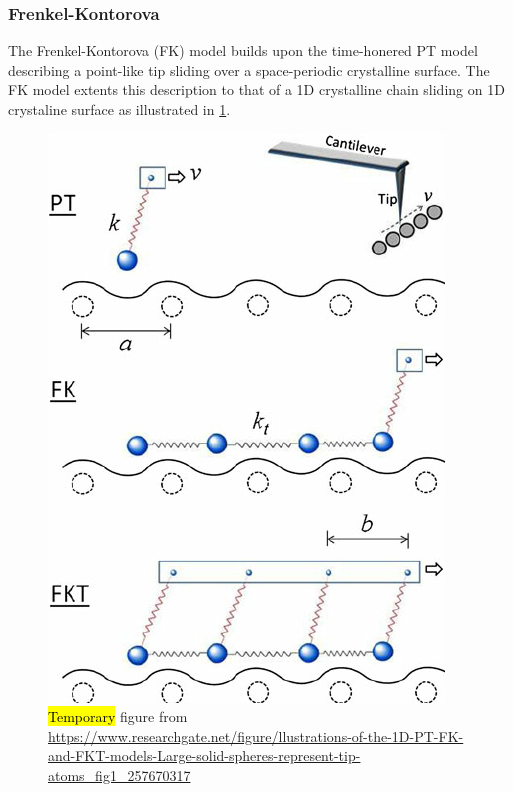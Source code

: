 



\subsubsection{Frenkel-Kontorova}


The Frenkel-Kontorova (FK) model builds upon the time-honered PT model describing a
point-like tip sliding over a space-periodic crystalline surface. The FK model
extents this description to that of a 1D crystalline chain sliding on 1D crystaline surface as illustrated in \ref{fig:PT_FK_FKT}.

\begin{figure}[H]
  \centering
  \includegraphics[width=0.4\linewidth]{figures/theory/PT_FK_FKT.png}
  \caption{\hl{Temporary} figure from \url{https://www.researchgate.net/figure/llustrations-of-the-1D-PT-FK-and-FKT-models-Large-solid-spheres-represent-tip-atoms_fig1_257670317}}
  \label{fig:PT_FK_FKT}
\end{figure}


